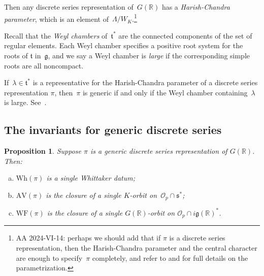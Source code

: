\documentclass[10pt,leqno]{article}
\newtheorem{proposition}[equation]{Proposition}
\newcommand{\R}{\mathbb R}
\newcommand{\g}{\mathfrak g}
\newcommand{\s}{\mathfrak s}
\newcommand{\AV}{\mathrm{AV}}
\newcommand{\Wh}{\mathrm{Wh}}
\newcommand{\WF}{\mathrm{WF}}
\begin{document}
Then any discrete series representation of~$G(\R)$ has a \emph{Harish-Chandra parameter}, which is an element of~$\Lambda/W_K$.\footnote{AA 2024-VI-14: perhaps we should add that if $\pi$ is a discrete series representation, then the Harish-Chandra parameter and the central character are enough to specify~$\pi$ completely, and refer to \cite[Section 8]{AV1} and \cite{Contragredient} for full details on the parametrization.   }

Recall that the \emph{Weyl chambers} of~$\mathfrak{t}^\ast$ are the connected components of the set of regular elements. Each Weyl chamber specifies a positive root system for the roots of $\mathfrak{t}$ in~$\g$, and we say a Weyl chamber is \emph{large} if the corresponding simple roots are all noncompact. 

If~$\lambda \in \mathfrak{t}^\ast$ is a representative for the Harish-Chandra parameter of a discrete series representation $\pi$, then~$\pi$ is generic if and only if the Weyl chamber containing~$\lambda$ is large. See~\cite[Section 6]{vogan-gelfand-kirillov}.


\subsection{The invariants for generic discrete series} 

\begin{proposition} \label{invariants_ds}
  Suppose $\pi$ is a generic discrete series representation of $G(\R)$. Then:
\begin{enumerate}[(a)]
\item $\Wh(\pi)$ is a single Whittaker datum;
\item $\AV(\pi)$ is the closure of a single $K$-orbit on~$\mathcal{O}_p \cap \s^*$;
\item  $\WF(\pi)$ is the closure of a single $G(\R)$-orbit on $\mathcal{O}_p \cap  i \g(\R)^*$.
\end{enumerate}
\end{proposition}
\end{document}
